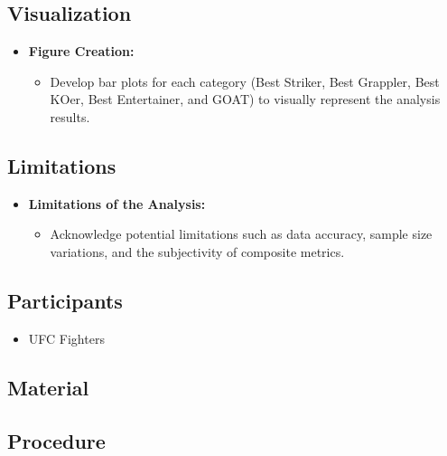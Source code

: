 \documentclass[
  man,floatsintext]{apa6}
\providecommand{\tightlist}{%
  \setlength{\itemsep}{0pt}\setlength{\parskip}{0pt}}
\begin{document}
\hypertarget{visualization}{%
\subsection{Visualization}\label{visualization}}

\begin{itemize}
\tightlist
\item
  \textbf{Figure Creation:}

  \begin{itemize}
  \tightlist
  \item
    Develop bar plots for each category (Best Striker, Best Grappler, Best KOer, Best Entertainer, and GOAT) to visually represent the analysis results.
  \end{itemize}
\end{itemize}

\hypertarget{limitations}{%
\subsection{Limitations}\label{limitations}}

\begin{itemize}
\tightlist
\item
  \textbf{Limitations of the Analysis:}

  \begin{itemize}
  \tightlist
  \item
    Acknowledge potential limitations such as data accuracy, sample size variations, and the subjectivity of composite metrics.
  \end{itemize}
\end{itemize}

\hypertarget{participants}{%
\subsection{Participants}\label{participants}}

\begin{itemize}
\tightlist
\item
  UFC Fighters
\end{itemize}

\hypertarget{material}{%
\subsection{Material}\label{material}}

\hypertarget{procedure}{%
\subsection{Procedure}\label{procedure}}
\end{document}
